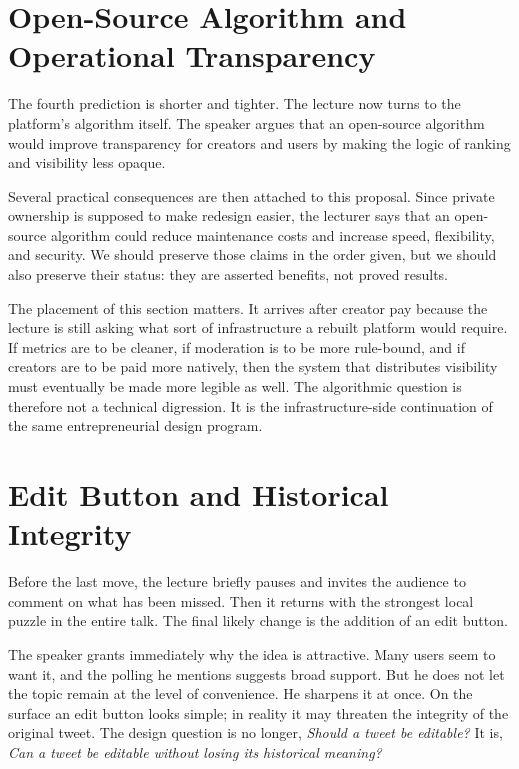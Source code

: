 \section{Open-Source Algorithm and Operational Transparency}

The fourth prediction is shorter and tighter. The lecture now turns to the platform's algorithm itself. The speaker argues that an open-source algorithm would improve transparency for creators and users by making the logic of ranking and visibility less opaque.

Several practical consequences are then attached to this proposal. Since private ownership is supposed to make redesign easier, the lecturer says that an open-source algorithm could reduce maintenance costs and increase speed, flexibility, and security. We should preserve those claims in the order given, but we should also preserve their status: they are asserted benefits, not proved results.

The placement of this section matters. It arrives after creator pay because the lecture is still asking what sort of infrastructure a rebuilt platform would require. If metrics are to be cleaner, if moderation is to be more rule-bound, and if creators are to be paid more natively, then the system that distributes visibility must eventually be made more legible as well. The algorithmic question is therefore not a technical digression. It is the infrastructure-side continuation of the same entrepreneurial design program.

\section{Edit Button and Historical Integrity}

Before the last move, the lecture briefly pauses and invites the audience to comment on what has been missed. Then it returns with the strongest local puzzle in the entire talk. The final likely change is the addition of an edit button.

The speaker grants immediately why the idea is attractive. Many users seem to want it, and the polling he mentions suggests broad support. But he does not let the topic remain at the level of convenience. He sharpens it at once. On the surface an edit button looks simple; in reality it may threaten the integrity of the original tweet. The design question is no longer, \emph{Should a tweet be editable?} It is, \emph{Can a tweet be editable without losing its historical meaning?}

